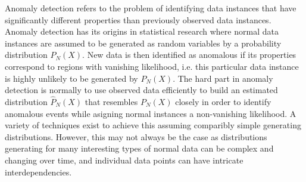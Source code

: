 \documentclass[a4paper,12pt,twoside]{report}
\begin{document}
Anomaly detection refers to the problem of identifying data instances that have significantly different properties than previously observed  data instances. Anomaly detection has its origins in statistical research where normal data instances are assumed to be generated as random variables by a probability distribution $P_\textit{N}(X)$. New data is then identified as anomalous if its properties correspond to regions with vanishing likelihood, i.e. this particular data instance is highly unlikely to be generated by $P_\textit{N}(X)$. The hard part in anomaly detection is normally to use observed data efficiently to build an estimated distribution $\hat{P}_\textit{N}(X)$ that resembles $P_\textit{N}(X)$ closely in order to identify anomalous events while asigning normal instances a non-vanishing likelihood. A variety of techniques exist to achieve this assuming comparibly simple generating distributions. However, this may not always be the case as distributions generating for many interesting types of normal data can be complex and changing over time, and individual data points can have intricate interdependencies. 
\end{document}
